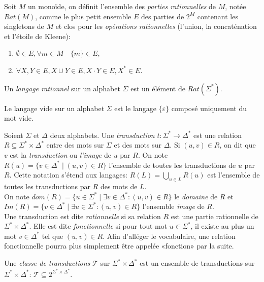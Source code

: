 	\begin{definition}
		Soit $M$ un monoïde, on définit l'ensemble des \emph{parties rationnelles} de $M$, notée $Rat(M)$, comme le plus petit ensemble $E$ des parties de $2^M$ contenant les singletons de $M$ et clos pour les \emph{opérations rationnelles} (l'union, la concaténation et l'étoile de Kleene):
		\begin{enumerate}
			\item $\emptyset \in E, \forall m \in M \quad \{m\} \in E$,
			\item $\forall X,Y \in E, X \cup Y \in E, X \cdot Y \in E, X^* \in E$.
		\end{enumerate}
		Un \emph{langage rationnel} sur un alphabet $\Sigma$ est un élément de $Rat(\Sigma^*)$.
	\end{definition}

	Le langage vide sur un alphabet $\Sigma$ est le langage $\{\varepsilon\}$ composé uniquement du mot vide.

    Soient $\Sigma$ et $\Delta$ deux alphabets. Une \emph{transduction} $t: \Sigma^*\to \Delta^*$ est une relation $R \subseteq \Sigma^*\times \Delta^*$ entre des mots sur $\Sigma$ et des mots sur $\Delta$. Si $(u,v) \in R$, on dit que $v$ est la \emph{transduction} ou \emph{l'image} de $u$ par $R$. On note $R(u) = \{v \in \Delta^* \mid (u,v) \in R\}$ l'ensemble de toutes les transductions de $u$ par $R$. Cette notation s'étend aux langages: $R(L) = \bigcup_{u \in L} R(u)$ est l'ensemble de toutes les transductions par $R$ des mots de $L$. \\
    On note $dom(R) = \{u \in \Sigma^* \mid \exists v \in \Delta^* : (u,v) \in R\}$ le \emph{domaine} de $R$ et $Im(R) = \{v \in \Delta^* \mid \exists u \in \Sigma^* : (u,v) \in R\}$ l'ensemble \emph{image} de $R$. \\
	Une transduction est dite \emph{rationnelle} si sa relation $R$ est une partie rationnelle de $\Sigma^* \times \Delta^*$. Elle est dite \emph{fonctionnelle} si pour tout mot $u \in \Sigma^*$, il existe au plus un mot $v \in \Delta^*$ tel que $(u,v) \in R$. Afin d'alléger le vocabulaire, une relation fonctionnelle pourra plus simplement être appelée «fonction» par la suite.

	Une \emph{classe de transductions} $\mathcal{T}$ sur $\Sigma^* \times \Delta^*$ est un ensemble de transductions sur $\Sigma^* \times \Delta^*$: $\mathcal{T} \subseteq 2^{\Sigma^* \times \Delta^*}$.

    
